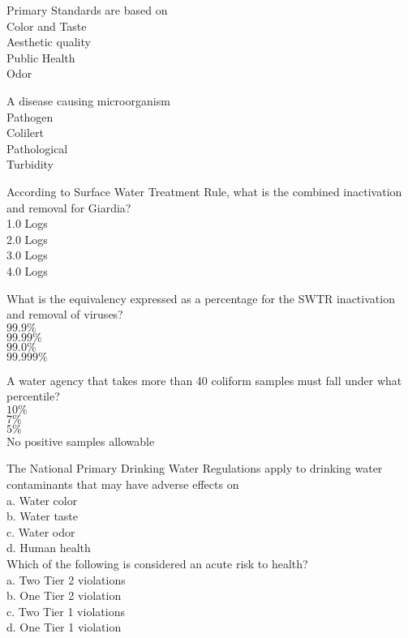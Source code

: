  Primary Standards are based on\\

Color and Taste\\
Aesthetic quality\\
Public Health\\
Odor


A disease causing microorganism\\

Pathogen\\
Colilert\\
Pathological\\
Turbidity


 According to Surface Water Treatment Rule, what is the combined inactivation and removal for Giardia?\\

1.0 Logs\\
2.0 Logs\\
3.0 Logs\\
4.0 Logs


 What is the equivalency expressed as a percentage for the SWTR inactivation and removal of viruses?\\

$99.9 \%$\\
$99.99 \%$\\
$99.0 \%$\\
$99.999 \%$


 A water agency that takes more than 40 coliform samples must fall under what percentile?\\

$10 \%$\\
$7 \%$\\
$5 \%$\\
No positive samples allowable


The National Primary Drinking Water Regulations apply to drinking water contaminants that may have adverse effects on\\
a.	Water color\\
b.	Water taste\\
c.	Water odor\\
d.	Human health\\

Which of the following is considered an acute risk to health?\\
a.	Two Tier 2 violations\\
b.	One Tier 2 violation\\
c.	Two Tier 1 violations\\
d.	One Tier 1 violation\\


